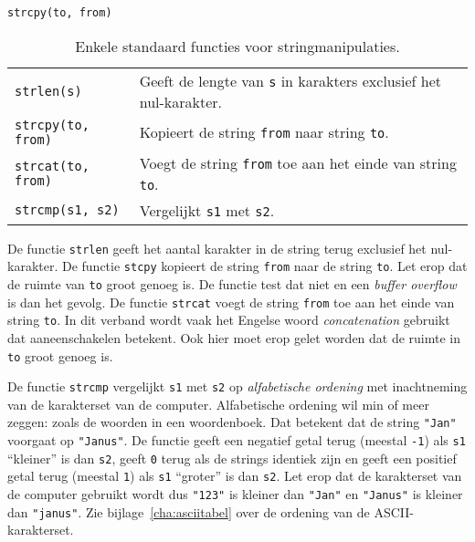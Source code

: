 \hbox{\texttt{strcpy(to, from)}}
\begin{table}[!ht]
\centering
\caption{Enkele standaard functies voor stringmanipulaties.}
\label{tab:arystringmanip}
\begin{tabular}{@{}p{}l@{}}
\toprule
\texttt{strlen(s)} &  Geeft de lengte van \texttt{s} in karakters exclusief het nul-karakter.\\
\texttt{strcpy(to, from)} &  Kopieert de string \texttt{from} naar string \texttt{to}.\\
\texttt{strcat(to, from)} &  Voegt de string \texttt{from} toe aan het einde van string \texttt{to}.\\
\texttt{strcmp(s1, s2)} &  Vergelijkt \texttt{s1} met \texttt{s2}.\\
\bottomrule
\end{tabular} 
\end{table}

De functie \texttt{strlen} geeft het aantal karakter in de string terug exclusief het nul-karakter. De functie \texttt{stcpy} kopieert de string \texttt{from} naar de string \texttt{to}. Let erop dat de ruimte van \texttt{to} groot genoeg is. De functie test dat niet en een \textsl{buffer overflow} is dan het gevolg. De functie \texttt{strcat} voegt de string \texttt{from} toe aan het einde van string \texttt{to}. In dit verband wordt vaak het Engelse woord \textsl{concatenation} gebruikt dat aaneenschakelen betekent. Ook hier moet erop gelet worden dat de ruimte in \texttt{to} groot genoeg is.

De functie \texttt{strcmp} vergelijkt \texttt{s1} met \texttt{s2} op \textsl{alfabetische ordening} met inachtneming van de karakterset van de computer. Alfabetische ordening wil min of meer zeggen: zoals de woorden in een woordenboek. Dat betekent dat de string \texttt{"Jan"} voorgaat op \texttt{"Janus"}. De functie geeft een negatief getal terug (meestal \texttt{-1}) als \texttt{s1} ``kleiner'' is dan \texttt{s2}, geeft \texttt{0} terug als de strings identiek zijn en geeft een positief getal terug (meestal \texttt{1}) als \texttt{s1} ``groter'' is dan \texttt{s2}. Let erop dat de karakterset van de computer gebruikt wordt dus \texttt{"123"} is kleiner dan \texttt{"Jan"} en \texttt{"Janus"} is kleiner dan \texttt{"janus"}. Zie bijlage~\ref{cha:asciitabel} over de ordening van de ASCII-karakterset.

